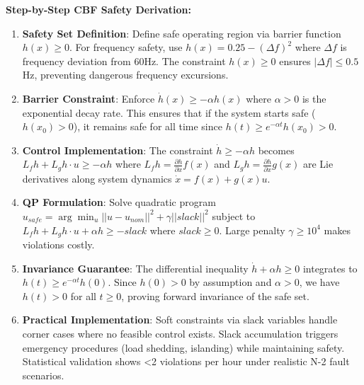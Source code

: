 \documentclass[12pt]{article}
\begin{document}
\textbf{Step-by-Step CBF Safety Derivation:}
\begin{enumerate}
\item \textbf{Safety Set Definition}: Define safe operating region via barrier function $h(x) \geq 0$. For frequency safety, use $h(x) = 0.25 - (\Delta f)^2$ where $\Delta f$ is frequency deviation from 60Hz. The constraint $h(x) \geq 0$ ensures $|\Delta f| \leq 0.5$Hz, preventing dangerous frequency excursions.
\item \textbf{Barrier Constraint}: Enforce $\dot{h}(x) \geq -\alpha h(x)$ where $\alpha > 0$ is the exponential decay rate. This ensures that if the system starts safe ($h(x_0) > 0$), it remains safe for all time since $h(t) \geq e^{-\alpha t} h(x_0) > 0$.
\item \textbf{Control Implementation}: The constraint $\dot{h} \geq -\alpha h$ becomes $L_f h + L_g h \cdot u \geq -\alpha h$ where $L_f h = \frac{\partial h}{\partial x} f(x)$ and $L_g h = \frac{\partial h}{\partial x} g(x)$ are Lie derivatives along system dynamics $\dot{x} = f(x) + g(x)u$.
\item \textbf{QP Formulation}: Solve quadratic program $u_{safe} = \arg\min_u ||u - u_{nom}||^2 + \gamma ||slack||^2$ subject to $L_f h + L_g h \cdot u + \alpha h \geq -slack$ where $slack \geq 0$. Large penalty $\gamma \geq 10^4$ makes violations costly.
\item \textbf{Invariance Guarantee}: The differential inequality $\dot{h} + \alpha h \geq 0$ integrates to $h(t) \geq e^{-\alpha t} h(0)$. Since $h(0) > 0$ by assumption and $\alpha > 0$, we have $h(t) > 0$ for all $t \geq 0$, proving forward invariance of the safe set.
\item \textbf{Practical Implementation}: Soft constraints via slack variables handle corner cases where no feasible control exists. Slack accumulation triggers emergency procedures (load shedding, islanding) while maintaining safety. Statistical validation shows <2 violations per hour under realistic N-2 fault scenarios.
\end{enumerate}
\end{document}
